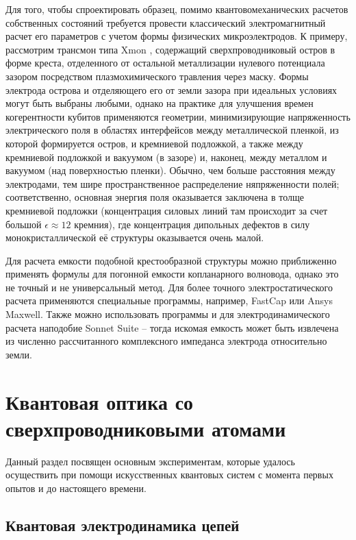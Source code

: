 \documentclass[14pt, a4paper]{extreport}
\numberwithin{equation}{section}
\begin{document}
Для того, чтобы спроектировать образец, помимо квантовомеханических расчетов собственных состояний требуется провести классический электромагнитный расчет его параметров с учетом формы физических микроэлектродов. К примеру, рассмотрим трансмон типа Xmon \cite{barends2013coherent}, содержащий сверхпроводниковый остров в форме креста, отделенного от остальной металлизации нулевого потенциала зазором посредством плазмохимического травления через маску. Формы электрода острова и отделяющего его от земли зазора при идеальных условиях могут быть выбраны любыми, однако на практике для улучшения времен когерентности кубитов применяются геометрии, минимизирующие напряженность электрического поля в областях интерфейсов между металлической пленкой, из которой формируется остров, и кремниевой подложкой, а также между кремниевой подложкой и вакуумом (в зазоре) и, наконец, между металлом и вакуумом (над поверхностью пленки). Обычно, чем больше расстояния между электродами, тем шире пространственное распределение няпряженности полей; соответственно, основная энергия поля оказывается заключена в толще кремниевой подложки (концентрация силовых линий там происходит за счет большой $\epsilon \approx 12$ кремния), где концентрация дипольных дефектов в силу монокристаллической её структуры оказывается очень малой.

Для расчета емкости подобной крестообразной структуры можно приближенно применять формулы для погонной емкости копланарного волновода, однако это не точный и не универсальный метод. Для более точного электростатического расчета применяются специальные программы, например, FastCap или Ansys Maxwell. Также можно использовать программы и для электродинамического расчета наподобие Sonnet Suite -- тогда искомая емкость может быть извлечена из численно рассчитанного комплексного импеданса электрода относительно земли.

\section{Квантовая оптика со сверхпроводниковыми атомами}

Данный раздел посвящен основным экспериментам, которые удалось осуществить при помощи искусственных квантовых систем с момента первых опытов и до настоящего времени.

\subsection{Квантовая электродинамика цепей}
\end{document}
